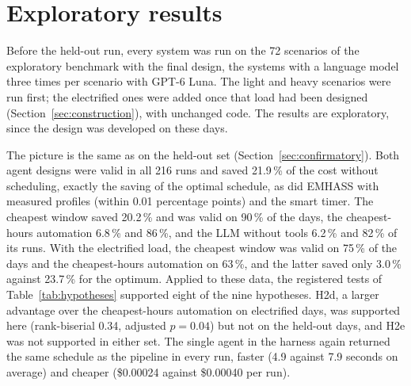 \documentclass[12pt,a4paper]{report}
\begin{document}
\section{Exploratory results}
\label{sec:exploratory}

Before the held-out run, every system was run on the 72 scenarios of
the exploratory benchmark with the final design, the systems with a
language model three times per scenario with GPT-6 Luna. The light and
heavy scenarios were run first; the electrified ones were added once
that load had been designed (Section~\ref{sec:construction}), with
unchanged code. The results are exploratory, since the design was
developed on these days.

The picture is the same as on the held-out set
(Section~\ref{sec:confirmatory}). Both agent designs were valid in all
216 runs and saved 21.9\,\% of the cost without scheduling, exactly the
saving of the optimal schedule, as did EMHASS with measured profiles
(within 0.01 percentage points) and the smart timer. The cheapest window
saved 20.2\,\% and was valid on 90\,\% of the days, the cheapest-hours
automation 6.8\,\% and 86\,\%, and the LLM without tools 6.2\,\% and
82\,\% of its runs. With the electrified load, the cheapest window was
valid on 75\,\% of the days and the cheapest-hours automation on
63\,\%, and the latter saved only 3.0\,\% against 23.7\,\% for the
optimum. Applied to these data, the registered tests of
Table~\ref{tab:hypotheses} supported eight of the nine hypotheses. H2d,
a larger advantage over the cheapest-hours automation on electrified
days, was supported here (rank-biserial 0.34, adjusted $p = 0.04$) but
not on the held-out days, and H2e was not supported in either set. The
single agent in the harness again returned the same schedule as the
pipeline in every run, faster (4.9 against 7.9 seconds on average) and
cheaper (\$0.00024 against \$0.00040 per run).
\end{document}
